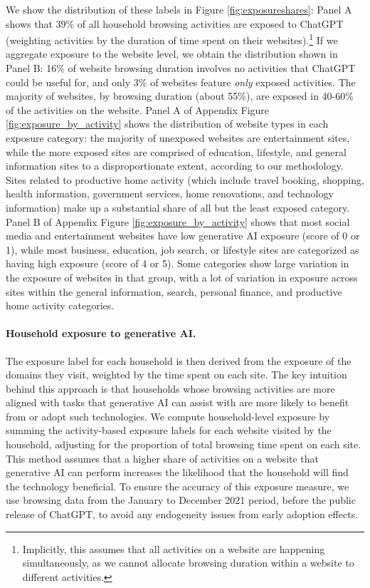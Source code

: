 \documentclass[12pt]{article}
\begin{document}
 We show the distribution of these labels in Figure \ref{fig:exposureshares}: Panel A shows that 39\% of all household browsing activities are exposed to ChatGPT (weighting activities by the duration of time spent on their websites).\footnote{Implicitly, this assumes that all activities on a website are happening simultaneously, as we cannot allocate browsing duration within a website to different activities.} If we aggregate exposure to the website level, we obtain the distribution shown in Panel B: 16\% of website browsing duration involves no activities that ChatGPT could be useful for, and only 3\% of websites feature \textit{only} exposed activities. The majority of websites, by browsing duration (about 55\%), are exposed in 40-60\% of the activities on the website. Panel A of Appendix Figure \ref{fig:exposure_by_activity} shows the distribution of website types in each exposure category: the majority of unexposed websites are entertainment sites, while the more exposed sites are comprised of education,  lifestyle, and general information sites to a disproportionate extent, according to our methodology. Sites related to productive home activity (which include travel booking, shopping, health information, government services, home renovations, and technology information) make up a substantial share of all but the least exposed category. Panel B of Appendix Figure \ref{fig:exposure_by_activity} shows that most social media and entertainment websites have low generative AI exposure (score of 0 or 1), while most business, education, job search, or lifestyle sites are categorized as having high exposure (score of 4 or 5). Some categories show large variation in the exposure of websites in that group, with a lot of variation in exposure across sites within the general information, search, personal finance, and productive home activity categories.

\paragraph{Household exposure to generative AI.}
The exposure label for each household is then derived from the exposure of the domains they visit, weighted by the time spent on each site.
The key intuition behind this approach is that households whose browsing activities are more aligned with tasks that generative AI can assist with are more likely to benefit from or adopt such technologies. We compute household-level exposure by summing the activity-based exposure labels for each website visited by the household, adjusting for the proportion of total browsing time spent on each site. This method assumes that a higher share of activities on a website that generative AI can perform increases the likelihood that the household will find the technology beneficial. To ensure the accuracy of this exposure measure, we use browsing data from the January  to December 2021 period, before the public release of ChatGPT, to avoid any endogeneity issues from early adoption effects.
\end{document}
